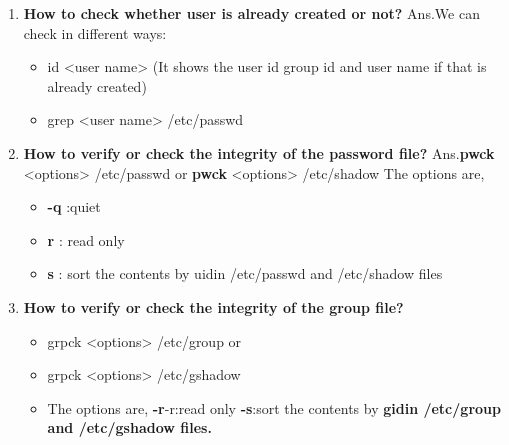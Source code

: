 \begin{enumerate}
    \item\textbf{How to check whether user is already created or not?}
    \newline
     Ans.We can check in different ways:
     \begin{itemize}
     	\item id   <user name>   (It shows the user id group id and user name if that is already created)
     	\item grep <user name> /etc/passwd
     \end{itemize}
         
    \bigskip
    \bigskip
    
    \item\textbf{How to verify or check the integrity of the password file?}
    \newline
     Ans.\textbf{pwck}  <options>   /etc/passwd    or
    \newline
        \textbf{pwck} <options>   /etc/shadow 
        The options are,  \begin{itemize}
                            \item \textbf{-q} :quiet
                            \item \textbf{r }: read only	
                            \item \textbf{s }: sort the contents by uidin /etc/passwd and  /etc/shadow  files
                          \end{itemize}

    \bigskip
    \bigskip

    \item\textbf{How to verify or check the integrity of the group file?}
     \begin{itemize}
        \item grpck   <options>   /etc/group    or
        \item grpck   <options>   /etc/gshadow 
        \item The options are,    \textbf{-r}-r:read only
                                  \textbf{-s}:sort the contents by  \textbf{gidin  /etc/group   and   /etc/gshadow files.}
     \end{itemize}

    \bigskip  
    \bigskip
    

\end{enumerate}
